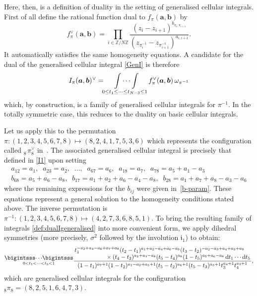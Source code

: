\documentclass[12pt,reqno]{amsart}
\theoremstyle{remark}
\renewcommand{\d}{{\mathrm d}}
\newcommand\ba{\boldsymbol a}
\newcommand\bb{\boldsymbol b}
\newcommand\fri{\mathfrak i}
\newcommand\Z{\mathbb Z}
\begin{document}
 Here, then,  is a definition of duality in the setting of generalised cellular integrals. 
 First of all define the  rational function dual to $f_{\pi}(\ba,\bb)$ by 
\begin{equation*}
\label{GenfDual}
f^{\vee}_{\pi}(\ba,\bb) = \prod_{i\in \Z/N\Z} \frac{ (z_i - z_{i+1})^{b_{\pi_i,\pi_{i+1}}}}{ (z_{\pi^{-1}_i} - z_{\pi^{-1}_{i+1}})^{a_{i,i+1}}}.
\end{equation*}
It automatically satisfies the same homogeneity equations. A candidate for the dual of the generalised cellular integral \eqref{GenI} is therefore
\begin{equation}
\label{def:dualIgeneralised}
I_{\pi}(\ba,\bb)^{\vee}=  \idotsint\limits_{0\leq t_1 \leq \dots \leq t_{N-3} \leq 1}   f^{\vee}_{\pi}(\ba,\bb) \, \omega_{\pi^{-1}}
\end{equation}
which, by construction, is  a family of generalised cellular integrals for $\pi^{-1}$. 
In the totally symmetric case, this reduces to the duality on basic cellular integrals. 


Let us apply this to the permutation  $\pi \colon  (1,2,3,4,5,6,7,8) \mapsto (8,2,4,1,7,5,3,6)$ which represents the configuration called ${}^{\phantom\vee}_8\!\pi^\vee_8$  in~\cite{Br16}. The associated generalised cellular integral is precisely that defined in \eqref{I1} upon setting
\begin{gather*} 
a_{12} = a_1, \;\;  a_{23} = a_2, \;\;  \dots , \;\; a_{67}=a_6, \;\; a_{18} = a_7, \;\; a_{78} = a_5+a_1-a_3\\
b_{68} = a_5+a_6-a_8, \;\;
b_{17} = a_1+a_2+a_6-a_4-a_8, \;\;
b_{28} = a_1+a_7+a_8-a_3-a_6
\end{gather*}
where the remaining expressions for the $b_{ij}$ were given in~\eqref{b-param}. These equations  represent a general solution to the homogeneity conditions stated above. The inverse permutation  is $\pi^{-1} \colon (1,2,3,4,5,6,7,8) \mapsto (4,2,7,3,6,8,5,1)$. To bring the resulting family of integrals \eqref{def:dualIgeneralised} into more convenient form, we apply dihedral symmetries (more precisely,  $\sigma^2$ followed by the involution $\fri_1$) to  obtain:
\begin{equation}
\raisebox{1.8mm}{$\displaystyle\mathop{\bigintsss\!\dotsb\!\bigintsss}_{0<t_1<\dots<t_5<1}$}
\frac{\splitfrac{t_1^{-a_2+a_4-a_6+a_7+a_8}(t_2-t_1)^{a_1+a_2-a_4+a_6-a_8}(t_3-t_2)^{-a_2-a_3+a_4+a_5+a_8}}
{\times(t_4-t_3)^{a_2+a_3-a_8}(t_5-t_4)^{a_8}(1-t_5)^{a_5+a_6-a_8}\,\d t_1\dotsb\d t_5}}
{(1-t_1)^{a_7+1}(1-t_2)^{a_1-a_3+a_5+1}(t_5-t_2)^{a_6+1}(t_5-t_3)^{a_5+1}t_3^{a_4+1}t_4^{a_3+1}},
\label{I1dual}
\end{equation}
which are generalised cellular integrals for the configuration ${}_8\pi_8=(8,2,5,1,6,4,7,3)$.
\end{document}
